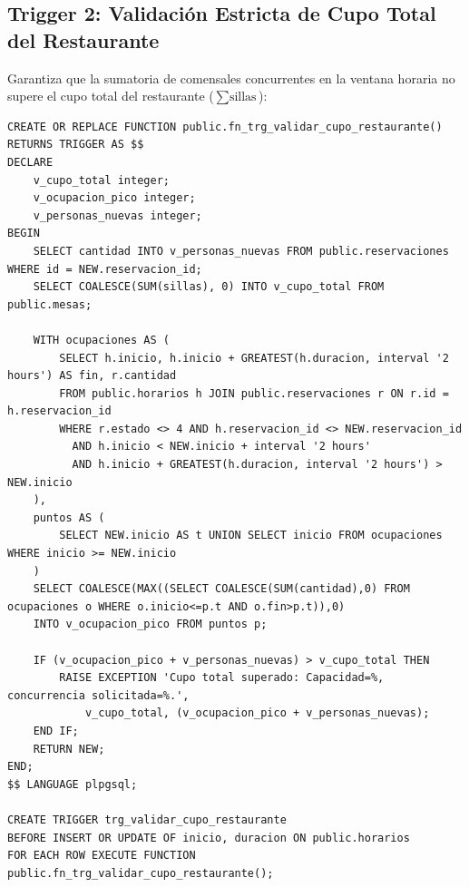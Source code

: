 \documentclass[11pt,letterpaper]{article}
\begin{document}
\subsection{Trigger 2: Validación Estricta de Cupo Total del Restaurante}
Garantiza que la sumatoria de comensales concurrentes en la ventana horaria no supere el cupo total del restaurante ($\sum \text{sillas}$):
\begin{lstlisting}[style=sqlstyle]
CREATE OR REPLACE FUNCTION public.fn_trg_validar_cupo_restaurante()
RETURNS TRIGGER AS $$
DECLARE
    v_cupo_total integer;
    v_ocupacion_pico integer;
    v_personas_nuevas integer;
BEGIN
    SELECT cantidad INTO v_personas_nuevas FROM public.reservaciones WHERE id = NEW.reservacion_id;
    SELECT COALESCE(SUM(sillas), 0) INTO v_cupo_total FROM public.mesas;

    WITH ocupaciones AS (
        SELECT h.inicio, h.inicio + GREATEST(h.duracion, interval '2 hours') AS fin, r.cantidad
        FROM public.horarios h JOIN public.reservaciones r ON r.id = h.reservacion_id
        WHERE r.estado <> 4 AND h.reservacion_id <> NEW.reservacion_id
          AND h.inicio < NEW.inicio + interval '2 hours'
          AND h.inicio + GREATEST(h.duracion, interval '2 hours') > NEW.inicio
    ),
    puntos AS (
        SELECT NEW.inicio AS t UNION SELECT inicio FROM ocupaciones WHERE inicio >= NEW.inicio
    )
    SELECT COALESCE(MAX((SELECT COALESCE(SUM(cantidad),0) FROM ocupaciones o WHERE o.inicio<=p.t AND o.fin>p.t)),0)
    INTO v_ocupacion_pico FROM puntos p;

    IF (v_ocupacion_pico + v_personas_nuevas) > v_cupo_total THEN
        RAISE EXCEPTION 'Cupo total superado: Capacidad=%, concurrencia solicitada=%.',
            v_cupo_total, (v_ocupacion_pico + v_personas_nuevas);
    END IF;
    RETURN NEW;
END;
$$ LANGUAGE plpgsql;

CREATE TRIGGER trg_validar_cupo_restaurante
BEFORE INSERT OR UPDATE OF inicio, duracion ON public.horarios
FOR EACH ROW EXECUTE FUNCTION public.fn_trg_validar_cupo_restaurante();
\end{lstlisting}
\end{document}
